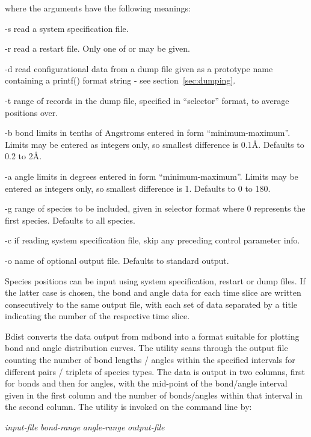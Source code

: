 \documentclass[a4paper,twoside]{report}
\begin{document}
where the arguments have the following meanings:
\begin{Argdescription}
\item[-s] read a system specification file.
\item[-r] read a restart file. Only one of  or  may be given.
\item[-d] read configurational data from a dump file given as a prototype name
  containing a printf() format string - see section~\ref{sec:dumping}. 
\item[-t] range of records in the dump file, specified in ``selector''
  format, to average positions over.
\item[-b] bond limits in tenths of Angstroms entered in form
  ``minimum-maximum''. Limits may be entered as integers only, so
  smallest difference is 0.1{\AA}. Defaults to 0.2 to 2{\AA}.
\item[-a] angle limits in degrees entered in form ``minimum-maximum''.
  Limits may be entered as integers only, so smallest difference is
  1{\textdegree}. Defaults to 0 to 180{\textdegree}.
\item[-g] range of species to be included, given in selector format
  where 0 represents the first species. Defaults to all species.
\item[-c] if reading system specification file, skip any preceding
  control parameter info.
\item[-o] name of optional output file. Defaults to standard output.
\end{Argdescription}


Species positions can be input using system specification, restart or dump
files. If the latter case is chosen, the bond and angle data for each time
slice are written consecutively to the same output file, with each set of
data separated by a title indicating the number of the respective time
slice.

Bdist converts the data output from mdbond into a format suitable for
plotting bond and angle distribution curves. The utility scans through the
output file counting the number of bond lengths / angles within the
specified intervals for different pairs / triplets of species types. The
data is output in two columns, first for bonds and then for angles, with
the mid-point of the bond/angle interval given in the first column and the
number of bonds/angles within that interval in the second column. The
utility is invoked on the command line by:

\begin{center}
\Lit{[-i} \textit{input-file}\Lit{]}
\Lit{[-b} \textit{bond-range}\Lit{]}
\Lit{[-a} \textit{angle-range}\Lit{]}
\Lit{[-o} \textit{output-file}\Lit{]}
\end{center}
\end{document}

